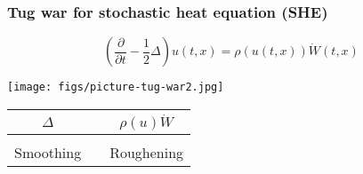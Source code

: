 \documentclass[9pt,xcolor=dvipsnames,table]{beamer}
\begin{document}
\begin{frame} %

  \frametitle{Tug war for stochastic heat equation (SHE)}
\[\left(\displaystyle\frac{\partial}{\partial t}
-\frac{1}{2}\Delta \right) u(t,x) =
\rho(u(t,x))  \dot{W}(t,x)\]
\vspace{-1.8em}
 \begin{center}
  \texttt{[image: figs/picture-tug-war2.jpg]}
  \vfill
  \begin{tabular}{ c c c  }
    $\Delta$  &  & $\rho(u)\dot{W}$ \\ [0.5em] \hline \\
    Smoothing &  & Roughening       \\
  \end{tabular}
 \end{center}
\end{frame}
\end{document}
